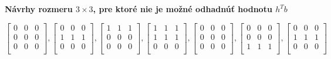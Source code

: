 \textbf{Návrhy rozmeru $3 \times 3$, pre ktoré nie je možné odhadnúť hodnotu $h^T b$}

\begin{center}
$
\begin{bmatrix}
0 & 0 & 0 \\ 
0 & 0 & 0 \\ 
0 & 0 & 0 \\ 
\end{bmatrix}
,
\begin{bmatrix}
0 & 0 & 0 \\
1 & 1 & 1 \\
0 & 0 & 0 \\
\end{bmatrix}
,
\begin{bmatrix}
1 & 1 & 1 \\
0 & 0 & 0 \\
0 & 0 & 0 \\
\end{bmatrix}
,
\begin{bmatrix}
1 & 1 & 1 \\
1 & 1 & 1 \\
0 & 0 & 0 \\
\end{bmatrix}
,
\begin{bmatrix}
0 & 0 & 0 \\
0 & 0 & 0 \\
0 & 0 & 0 \\
\end{bmatrix}
,
\begin{bmatrix}
0 & 0 & 0 \\
0 & 0 & 0 \\
1 & 1 & 1 \\
\end{bmatrix}
,
\begin{bmatrix}
0 & 0 & 0 \\
1 & 1 & 1 \\
0 & 0 & 0 \\
\end{bmatrix}
$
\end{center}
